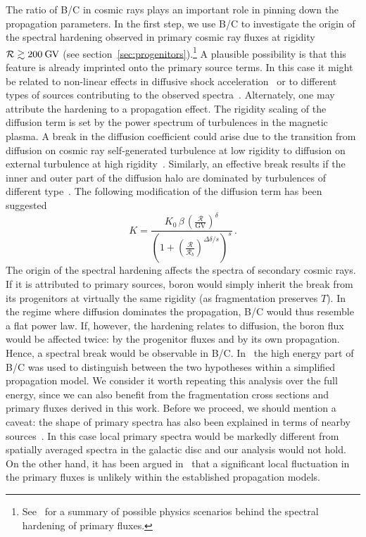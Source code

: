 \documentclass[a4paper,11pt]{article}
\newcommand{\eVdist}{\kern-0.06em}
\newcommand{\gv}{\:\text{G\eVdist V}}
\newcommand{\R}{\mathcal{R}}
\begin{document}
The ratio of B/C in cosmic rays plays an important role in pinning down the propagation parameters. In the first step, we use B/C to investigate the origin of the spectral hardening observed in primary cosmic ray fluxes at rigidity $\R \gtrsim 200\gv$ (see section~\ref{sec:progenitors}).\footnote{See~\cite{Serpico:2015caa} for a summary of possible physics scenarios behind the spectral hardening of primary fluxes.} A plausible possibility is that this feature is already imprinted onto the primary source terms. In this case it might be related to non-linear effects in diffusive shock
acceleration~\cite{Ptuskin:2012qu} or to different types of sources contributing to the observed spectra~\cite{Ohira:2015ega}. Alternately, one may attribute the hardening to a propagation effect. The rigidity scaling of the diffusion term is set by the power spectrum of turbulences in the magnetic plasma. A break in the diffusion coefficient could arise due to the transition from diffusion on cosmic ray self-generated turbulence at low rigidity to diffusion on external turbulence at high rigidity~\cite{Blasi:2012yr}.
Similarly, an effective break results if the inner and outer part of the diffusion halo are dominated by turbulences of different type~\cite{Tomassetti:2012ga}. The following modification of the diffusion term has been suggested~\cite{Genolini:2017dfb}
\begin{equation}\label{eq:breakdiffusion}
 K = \frac{K_0 \,\beta \,\left(\frac{\mathcal{R}}{\text{GV}}\right)^\delta}{\left(1+\left(\frac{\R}{\R_b}\right)^{\Delta\delta/s}\right)^{s}}\,.
\end{equation}
The origin of the spectral hardening affects the spectra of secondary cosmic rays. If it is attributed to primary sources, boron would simply inherit the break from its progenitors at virtually the same rigidity (as fragmentation preserves $T$). In the regime where diffusion dominates the propagation, B/C would thus resemble a flat power law. If, however, the hardening relates to diffusion, the boron flux would be affected twice: by the progenitor fluxes and by its own propagation. Hence, a spectral break would be observable in B/C. In~\cite{Genolini:2017dfb} the high energy part of B/C was used to distinguish between the two hypotheses within a simplified propagation model. We consider it worth repeating this analysis over the full energy, since we can also benefit from the fragmentation cross sections and primary fluxes derived in this work. Before we proceed, we should mention a caveat: the shape of primary spectra has also been explained in terms of nearby sources~\cite{Thoudam:2011aa,Bernard:2012pia,Tomassetti:2015xem,Kachelriess:2017yzq}. In this case local primary spectra would be markedly different from spatially averaged spectra in the galactic disc and our analysis would not hold. On the other hand, it has been argued in~\cite{Blasi:2011fm,Salati:2016owk} that a significant local fluctuation in the primary fluxes is unlikely within the established propagation models.
\end{document}
